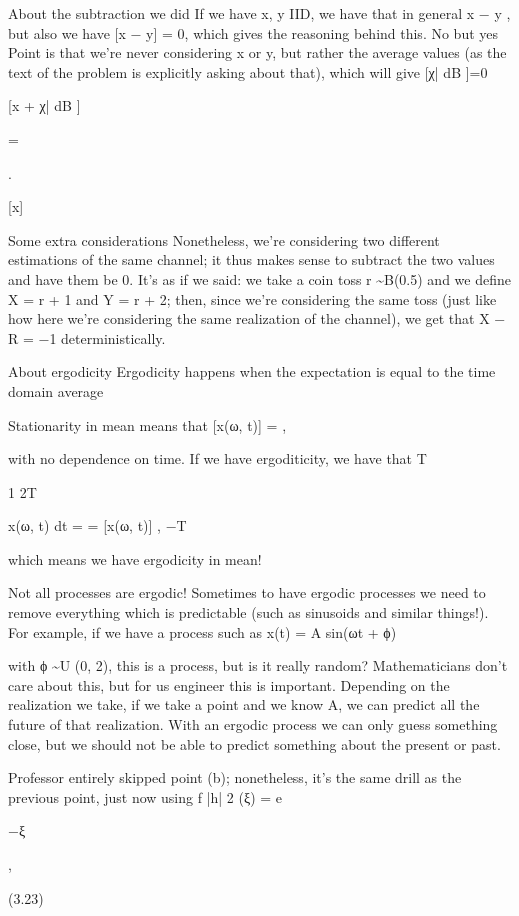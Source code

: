 {{{{{About the subtraction we did If we have x, y IID, we have that in general x − y , but also we have [x − y] = 0,
which gives the reasoning behind this.
​No but yes Point is that we're never considering x or y, but rather the average values (as the text of the problem is explicitly asking about that), which will give [χ| dB ]=0

[x + χ| dB ]

=

.

[x]

​Some extra considerations Nonetheless, we're considering two different estimations of the same channel; it thus makes sense to subtract the two values and have them be 0. It's as if we said: we take a coin toss r \sim B(0.5) and we define X = r + 1 and Y = r + 2; then,
since we're considering the same toss (just like how here we're considering the same realization of the channel), we get that X − R = −1 deterministically.

About ergodicity Ergodicity happens when the expectation is equal to the time domain average

Stationarity in mean means that [x(ω, t)] = \mu ,

with no dependence on time.
If we have ergoditicity, we have that T

1
\int 2T

x(ω, t) dt = \mu = [x(ω, t)] ,
−T

which means we have ergodicity in mean!

Not all processes are ergodic! Sometimes to have ergodic processes we need to remove everything which is predictable (such as sinusoids and similar things!).
For example, if we have a process such as x(t) = A sin(ωt + ϕ)

with ϕ \sim U (0, 2\pi), this is a process, but is it really random?
Mathematicians don't care about this, but for us engineer this is important.
Depending on the realization we take, if we take a point and we know A, we can predict all the future of that realization.
With an ergodic process we can only guess something close, but we should not be able to predict something about the present or past.

Professor entirely skipped point (b); nonetheless, it's the same drill as the previous point, just now using f |h| 2 (ξ) = e

−ξ

,

(3.23)

}}}}}
